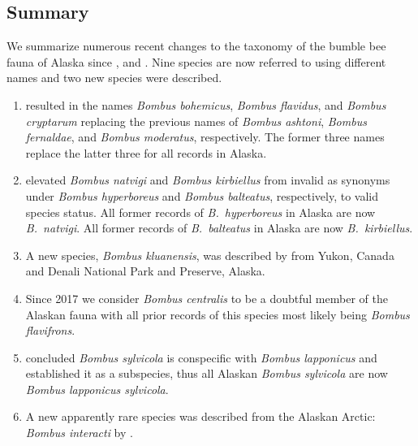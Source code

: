 \vspace{-1cm}
\begin{center}
 \parbox[t][][s]{14cm}{\section{Summary}
 We summarize numerous recent changes to the taxonomy of the bumble bee fauna of Alaska since \citet{Pampell2010, Pampell2013}, \citet{KochStrange2012} and \citet{Pampelletal2012, Pampelletal2015}. Nine species are now referred to using different names and two new species were described.

 \begin{enumerate}
\item \citet{Williamsetal2014} resulted in the names \textit{Bombus bohemicus}, \textit{Bombus flavidus}, and \textit{Bombus cryptarum} replacing the previous names of \textit{Bombus ashtoni}, \textit{Bombus fernaldae}, and \textit{Bombus moderatus}, respectively. The former three names replace the latter three for all records in Alaska.

\item \citet{Williamsetal2015} elevated \textit{Bombus natvigi} and \textit{Bombus kirbiellus} from invalid as synonyms under \textit{Bombus hyperboreus} and \textit{Bombus balteatus}, respectively, to valid species status. All former records of \textit{B.\ hyperboreus} in Alaska are now \textit{B.\ natvigi}. All former records of \textit{B.\ balteatus} in Alaska are now \textit{B.\ kirbiellus}.

\item A new species, \textit{Bombus kluanensis}, was described by \citet{Williamsetal2016} from Yukon, Canada and Denali National Park and Preserve, Alaska.

\item Since 2017 we consider \textit{Bombus centralis} to be a doubtful member of the Alaskan fauna with all prior records of this species most likely being \textit{Bombus flavifrons}. 

\item \citet{Martinetetal2019} concluded \textit{Bombus sylvicola} is conspecific with \textit{Bombus lapponicus} and established it as a subspecies, thus all Alaskan \textit{Bombus sylvicola} are now \textit{Bombus lapponicus sylvicola}.

\item A new apparently rare species was described from the Alaskan Arctic: \textit{Bombus interacti} by \citet{Martinetetal2019}.


\end{enumerate}}
\end{center}
